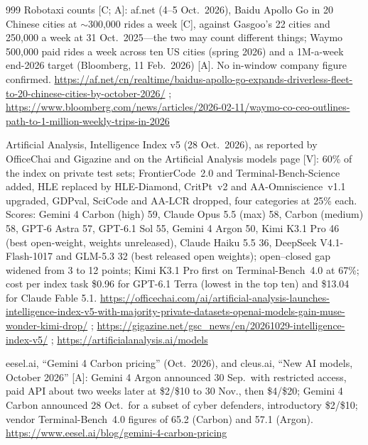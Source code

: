 \begin{thebibliography}{999}
 Robotaxi counts [C; A]: af.net (4--5 Oct.\ 2026), Baidu Apollo Go in 20 Chinese cities at $\sim$300,000 rides a week [C], against Gasgoo's 22 cities and 250,000 a week at 31 Oct.\ 2025---the two may count different things; Waymo 500,000 paid rides a week across ten US cities (spring 2026) and a 1M-a-week end-2026 target (Bloomberg, 11 Feb.\ 2026) [A]. No in-window company figure confirmed. \url{https://af.net/cn/realtime/baidus-apollo-go-expands-driverless-fleet-to-20-chinese-cities-by-october-2026/} ; \url{https://www.bloomberg.com/news/articles/2026-02-11/waymo-co-ceo-outlines-path-to-1-million-weekly-trips-in-2026}


 Artificial Analysis, Intelligence Index v5 (28 Oct.\ 2026), as reported by OfficeChai and Gigazine and on the Artificial Analysis models page [V]: 60\% of the index on private test sets; FrontierCode~2.0 and Terminal-Bench-Science added, HLE replaced by HLE-Diamond, CritPt~v2 and AA-Omniscience~v1.1 upgraded, GDPval, SciCode and AA-LCR dropped, four categories at 25\% each. Scores: Gemini 4 Carbon (high) 59, Claude Opus 5.5 (max) 58, Carbon (medium) 58, GPT-6 Astra 57, GPT-6.1 Sol 55, Gemini 4 Argon 50, Kimi K3.1 Pro 46 (best open-weight, weights unreleased), Claude Haiku 5.5 36, DeepSeek V4.1-Flash-1017 and GLM-5.3 32 (best released open weights); open--closed gap widened from 3 to 12 points; Kimi K3.1 Pro first on Terminal-Bench~4.0 at 67\%; cost per index task \$0.96 for GPT-6.1 Terra (lowest in the top ten) and \$13.04 for Claude Fable 5.1. \url{https://officechai.com/ai/artificial-analysis-launches-intelligence-index-v5-with-majority-private-datasets-openai-models-gain-muse-wonder-kimi-drop/} ; \url{https://gigazine.net/gsc_news/en/20261029-intelligence-index-v5/} ; \url{https://artificialanalysis.ai/models}

 eesel.ai, ``Gemini 4 Carbon pricing'' (Oct.\ 2026), and cleus.ai, ``New AI models, October 2026'' [A]: Gemini 4 Argon announced 30 Sep.\ with restricted access, paid API about two weeks later at \$2/\$10 to 30 Nov., then \$4/\$20; Gemini 4 Carbon announced 28 Oct.\ for a subset of cyber defenders, introductory \$2/\$10; vendor Terminal-Bench~4.0 figures of 65.2 (Carbon) and 57.1 (Argon). \url{https://www.eesel.ai/blog/gemini-4-carbon-pricing}


\end{thebibliography}
